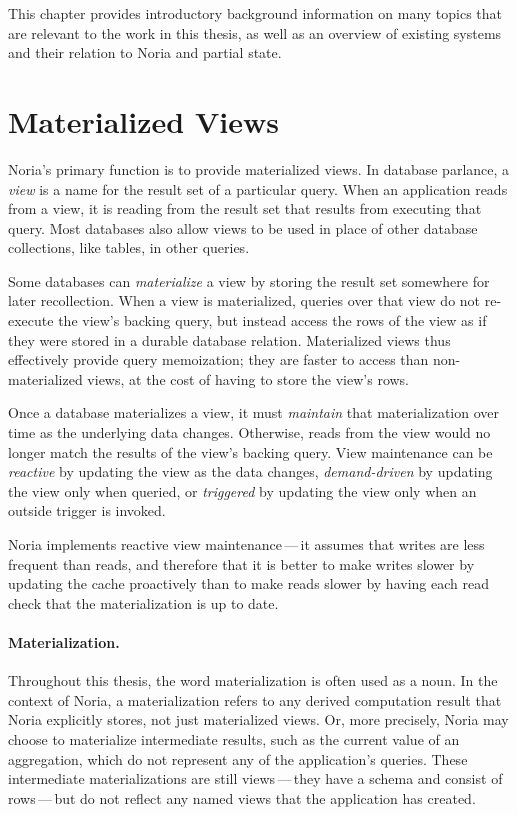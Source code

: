 This chapter provides introductory background information on many topics that
are relevant to the work in this thesis, as well as an overview of existing
systems and their relation to Noria and partial state.

\section{Materialized Views}

Noria's primary function is to provide materialized views. In database parlance,
a \textit{view} is a name for the result set of a particular query. When an
application reads from a view, it is reading from the result set that results
from executing that query. Most databases also allow views to be used in place
of other database collections, like tables, in other queries.

Some databases can \textit{materialize} a view by storing the result set
somewhere for later recollection. When a view is materialized, queries over that
view do not re-execute the view's backing query, but instead access the rows of
the view as if they were stored in a durable database relation. Materialized
views thus effectively provide query memoization; they are faster to access than
non-materialized views, at the cost of having to store the view's rows.

Once a database materializes a view, it must \textit{maintain} that
materialization over time as the underlying data changes. Otherwise, reads from
the view would no longer match the results of the view's backing query. View
maintenance can be \emph{reactive} by updating the view as the data changes,
\emph{demand-driven} by updating the view only when queried, or \emph{triggered}
by updating the view only when an outside trigger is invoked.

Noria implements reactive view maintenance\,---\,it assumes that writes are less
frequent than reads, and therefore that it is better to make writes slower by
updating the cache proactively than to make reads slower by having each read
check that the materialization is up to date.

\paragraph{Materialization.}
Throughout this thesis, the word materialization is often used as a noun. In the
context of Noria, a materialization refers to any derived computation result
that Noria explicitly stores, not just materialized views. Or, more precisely,
Noria may choose to materialize intermediate results, such as the current value
of an aggregation, which do not represent any of the application's queries.
These intermediate materializations are still views\,---\,they have a schema and
consist of rows\,---\,but do not reflect any named views that the application
has created.

